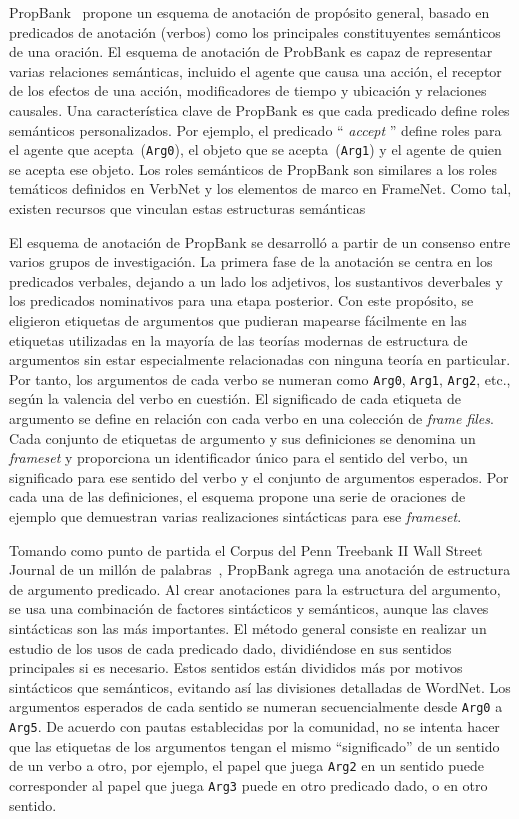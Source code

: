 PropBank~\cite{propbank} propone un esquema de anotación de propósito general, basado en predicados de anotación (verbos) como los principales constituyentes semánticos de una oración.
El esquema de anotación de ProbBank es capaz de representar varias relaciones semánticas, incluido el agente que causa una acción, el receptor de los efectos de una acción, modificadores de tiempo y ubicación y relaciones causales.
Una característica clave de PropBank es que cada predicado define roles semánticos personalizados.
Por ejemplo, el predicado `` \textit{accept} '' define roles para el agente que acepta~(\texttt{Arg0}), el objeto que se acepta~(\texttt{Arg1}) y el agente de quien se acepta ese objeto.
Los roles semánticos de PropBank son similares a los roles temáticos definidos en VerbNet y los elementos de marco en FrameNet. Como tal, existen recursos que vinculan estas estructuras semánticas~\cite{semlink}

El esquema de anotación de PropBank se desarrolló a partir de un consenso entre varios grupos de investigación.
La primera fase de la anotación se centra en los predicados verbales, dejando a un lado los adjetivos, los sustantivos deverbales y los predicados nominativos para una etapa posterior.
Con este propósito, se eligieron etiquetas de argumentos que pudieran mapearse fácilmente en las etiquetas utilizadas en la mayoría de las teorías modernas de estructura de argumentos sin estar especialmente relacionadas con ninguna teoría en particular.
Por tanto, los argumentos de cada verbo se numeran como \texttt{Arg0}, \texttt{Arg1}, \texttt{Arg2}, etc., según la valencia del verbo en cuestión.
El significado de cada etiqueta de argumento se define en relación con cada verbo en una colección de \textit{frame files}.
Cada conjunto de etiquetas de argumento y sus definiciones se denomina un \textit{frameset} y proporciona un identificador único para el sentido del verbo, un significado para ese sentido del verbo y el conjunto de argumentos esperados.
Por cada una de las definiciones, el esquema propone una serie de oraciones de ejemplo que demuestran varias realizaciones sintácticas para ese \textit{frameset}.

Tomando como punto de partida el Corpus del Penn Treebank II Wall Street Journal de un millón de palabras~\cite{Marcus1994}, PropBank agrega una anotación de estructura de argumento predicado.
Al crear anotaciones para la estructura del argumento, se usa una combinación de factores sintácticos y semánticos, aunque las claves sintácticas son las más importantes.
El método general consiste en realizar un estudio de los usos de cada predicado dado, dividiéndose en sus sentidos principales si es necesario.
Estos sentidos están divididos más por motivos sintácticos que semánticos, evitando así las divisiones detalladas de WordNet.
Los argumentos esperados de cada sentido se numeran secuencialmente desde \texttt{Arg0} a \texttt{Arg5}.
De acuerdo con pautas establecidas por la comunidad, no se intenta hacer que las etiquetas de los argumentos tengan el mismo ``significado'' de un sentido de un verbo a otro, por ejemplo, el papel que juega \texttt{Arg2} en un sentido puede corresponder al papel que juega \texttt{Arg3} puede en otro predicado dado, o en otro sentido.

